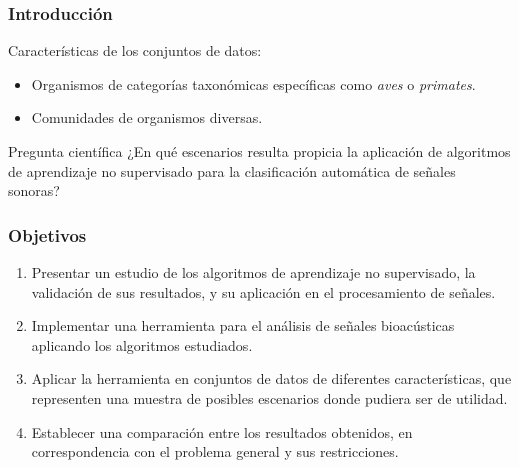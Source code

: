 \begin{frame}
    \frametitle{Introducción}

    Características de los conjuntos de datos:
    \begin{itemize}
        \item Organismos de categorías taxonómicas específicas como \textit{aves} o \textit{primates}.
        \item Comunidades de organismos diversas.
    \end{itemize}

    \pause
    \begin{block}{Pregunta científica}
        ¿En qué escenarios resulta propicia la aplicación de algoritmos de aprendizaje no supervisado para la clasificación automática de señales sonoras?
    \end{block}
\end{frame}

\begin{frame}
    \frametitle{Objetivos}

    \begin{enumerate}
        \item<1-> Presentar un estudio de los algoritmos de aprendizaje no supervisado, la validación de sus resultados, y su aplicación en el procesamiento de señales.
        \item<2-> Implementar una herramienta para el análisis de señales bioacústicas aplicando los algoritmos estudiados.
        \item<3-> Aplicar la herramienta en conjuntos de datos de diferentes características, que representen una muestra de posibles escenarios donde pudiera ser de utilidad.
        \item<4-> Establecer una comparación entre los resultados obtenidos, en correspondencia con el problema general y sus restricciones.
    \end{enumerate}
\end{frame}